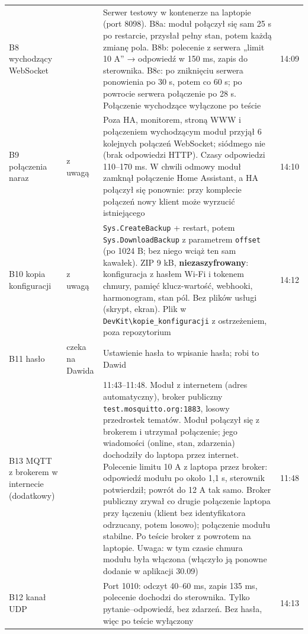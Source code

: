 \documentclass[11pt,a4paper]{article}
\begin{document}
\begin{longtable}{>{\raggedright\arraybackslash}p{3.00cm}>{\raggedright\arraybackslash}p{2.62cm}>{\raggedright\arraybackslash}p{7.10cm}>{\raggedright\arraybackslash}p{2.11cm}}
B8 wychodzący WebSocket & \leavevmode{\symbolfont\color{apgreen}\textbf{✔}} & Serwer testowy w kontenerze na laptopie (port 8098). B8a: moduł połączył się sam 25 s po restarcie, przysłał pełny stan, potem każdą zmianę pola. B8b: polecenie z serwera „limit 10 A” {\symbolfont→} odpowiedź w 150 ms, zapis do sterownika. B8c: po zniknięciu serwera ponowienia po 30 s, potem co 60 s; po powrocie serwera połączenie po 28 s. Połączenie wychodzące wyłączone po teście & 29.09 14:09 \\
B9 połączenia naraz & \leavevmode{\symbolfont\color{apgreen}\textbf{✔}} z uwagą & Poza HA, monitorem, stroną WWW i połączeniem wychodzącym moduł przyjął 6 kolejnych połączeń WebSocket; siódmego nie (brak odpowiedzi HTTP). Czasy odpowiedzi 110–170 ms. W chwili odmowy moduł zamknął połączenie Home Assistant, a HA połączył się ponownie: przy komplecie połączeń nowy klient może wyrzucić istniejącego & 29.09 14:10 \\
B10 kopia konfiguracji & \leavevmode{\symbolfont\color{apgreen}\textbf{✔}} z uwagą & \texttt{Sys.\allowbreak{}CreateBackup} + restart, potem \texttt{Sys.\allowbreak{}DownloadBackup} z parametrem \texttt{offset} (po 1024 B; bez niego wciąż ten sam kawałek). ZIP 9 kB, \textbf{niezaszyfrowany}: konfiguracja z hasłem Wi-Fi i tokenem chmury, pamięć klucz-wartość, webhooki, harmonogram, stan pól. Bez plików usługi (skrypt, ekran). Plik w \texttt{DevKit\textbackslash{}kopie\_\allowbreak{}konfiguracji} z ostrzeżeniem, poza repozytorium & 29.09 14:12 \\
B11 hasło & czeka na Dawida & Ustawienie hasła to wpisanie hasła; robi to Dawid &  \\
B13 MQTT z brokerem w internecie (dodatkowy) & \leavevmode{\symbolfont\color{apgreen}\textbf{✔}} & 01.10 11:43–11:48. Moduł z internetem (adres automatyczny), broker publiczny \texttt{test.\allowbreak{}mosquitto.\allowbreak{}org:\allowbreak{}1883}, losowy przedrostek tematów. Moduł połączył się z brokerem i utrzymał połączenie; jego wiadomości (online, stan, zdarzenia) dochodziły do laptopa przez internet. Polecenie limitu 10 A z laptopa przez broker: odpowiedź modułu po około 1,1 s, sterownik potwierdził; powrót do 12 A tak samo. Broker publiczny zrywał co drugie połączenie laptopa przy łączeniu (klient bez identyfikatora odrzucany, potem losowo); połączenie modułu stabilne. Po teście broker z powrotem na laptopie. Uwaga: w tym czasie chmura modułu była włączona (włączyło ją ponowne dodanie w aplikacji 30.09) & 01.10 11:48 \\
B12 kanał UDP & \leavevmode{\symbolfont\color{apgreen}\textbf{✔}} & Port 1010: odczyt 40–60 ms, zapis 135 ms, polecenie dochodzi do sterownika. Tylko pytanie–odpowiedź, bez zdarzeń. Bez hasła, więc po teście wyłączony & 29.09 14:13 \\
\end{longtable}
\end{document}
